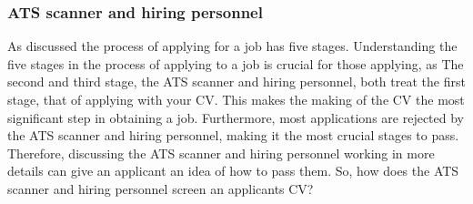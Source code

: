 \subsubsection{ATS scanner and hiring personnel}
As discussed the process of applying for a job has five stages.
Understanding the five stages in the process of applying to a job is crucial for those applying, as 
The second and third stage, the ATS scanner and hiring personnel, both treat the first stage, that of applying with your CV.
This makes the making of the CV the most significant step in obtaining a job.
Furthermore, most applications are rejected by the ATS scanner and hiring personnel, making it the most crucial stages to pass.
Therefore, discussing the ATS scanner and hiring personnel working in more details can give an applicant an idea of how to pass them.
So, how does the ATS scanner and hiring personnel screen an applicants CV?

